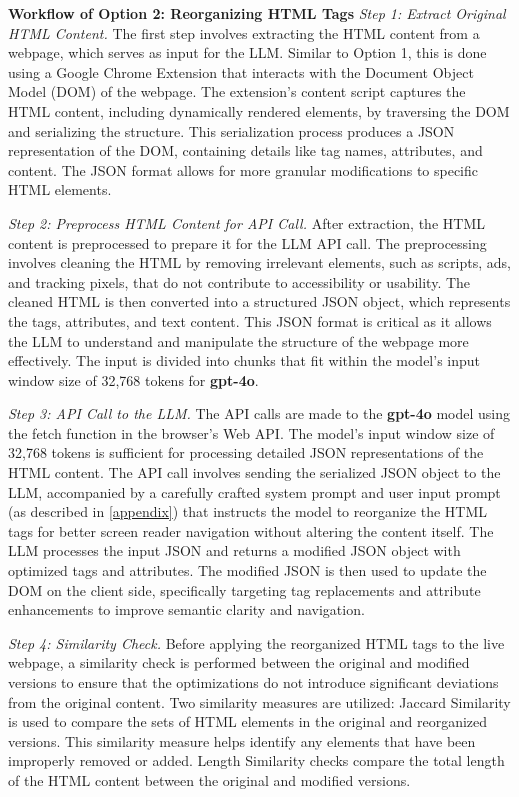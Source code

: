 \textbf{Workflow of Option 2: Reorganizing HTML Tags}
\textit{Step 1: Extract Original HTML Content.} The first step involves extracting the HTML content from a webpage, which serves as input for the LLM. Similar to Option 1, this is done using a Google Chrome Extension that interacts with the Document Object Model (DOM) of the webpage. The extension’s content script captures the HTML content, including dynamically rendered elements, by traversing the DOM and serializing the structure. This serialization process produces a JSON representation of the DOM, containing details like tag names, attributes, and content. The JSON format allows for more granular modifications to specific HTML elements.

\textit{Step 2: Preprocess HTML Content for API Call.} After extraction, the HTML content is preprocessed to prepare it for the LLM API call. The preprocessing involves cleaning the HTML by removing irrelevant elements, such as scripts, ads, and tracking pixels, that do not contribute to accessibility or usability. The cleaned HTML is then converted into a structured JSON object, which represents the tags, attributes, and text content. This JSON format is critical as it allows the LLM to understand and manipulate the structure of the webpage more effectively. The input is divided into chunks that fit within the model's input window size of 32,768 tokens for \textbf{gpt-4o}.

\textit{Step 3: API Call to the LLM.} The API calls are made to the \textbf{gpt-4o} model using the fetch function in the browser’s Web API. The model's input window size of 32,768 tokens is sufficient for processing detailed JSON representations of the HTML content. The API call involves sending the serialized JSON object to the LLM, accompanied by a carefully crafted system prompt and user input prompt (as described in \ref{appendix}) that instructs the model to reorganize the HTML tags for better screen reader navigation without altering the content itself. The LLM processes the input JSON and returns a modified JSON object with optimized tags and attributes. The modified JSON is then used to update the DOM on the client side, specifically targeting tag replacements and attribute enhancements to improve semantic clarity and navigation.

\textit{Step 4: Similarity Check.} Before applying the reorganized HTML tags to the live webpage, a similarity check is performed between the original and modified versions to ensure that the optimizations do not introduce significant deviations from the original content. Two similarity measures are utilized: Jaccard Similarity is used to compare the sets of HTML elements in the original and reorganized versions. This similarity measure helps identify any elements that have been improperly removed or added. Length Similarity checks compare the total length of the HTML content between the original and modified versions.

